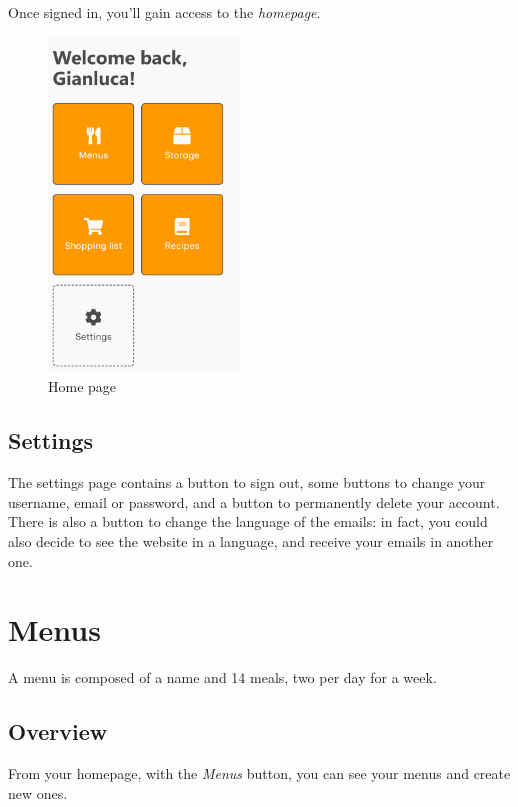 \documentclass[12pt, a4paper]{report}
\begin{document}
    Once signed in, you'll gain access to the \emph{homepage}.

    \begin{figure}[H]
        \centering
        \includegraphics[width=0.45\textwidth]{assets/en/home.png}
        \caption{Home page}
    \end{figure}

    \section{Settings}

    The settings page contains a button to sign out, some buttons to change your username, email or password, and a button to permanently delete
    your account. There is also a button to change the language of the emails: in fact, you could also decide to see the website in a language, and
    receive your emails in another one.



    \chapter{Menus}

    A menu is composed of a name and 14 meals, two per day for a week.

    \section{Overview}

    From your homepage, with the \emph{Menus} button, you can see your menus and create new ones.
\end{document}
